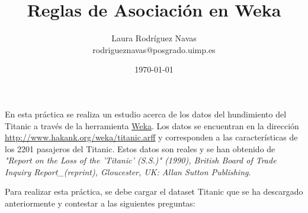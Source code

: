 \documentclass[11pt]{exam}
\title{Reglas de Asociación en Weka}
\author{Laura Rodríguez Navas \\ rodrigueznavas@posgrado.uimp.es}
\date{\today}
\begin{document}
\maketitle

En esta práctica se realiza un estudio acerca de los datos del hundimiento del Titanic a través de la herramienta \href{https://www.cs.waikato.ac.nz/ml/weka/}{Weka}. Los datos se encuentran en la dirección \url{http://www.hakank.org/weka/titanic.arff} y corresponden a las características de los 2201 pasajeros del Titanic. Estos datos son reales y se han obtenido de \textit{"Report on the Loss of the 'Titanic' (S.S.)" (1990), British Board of Trade Inquiry Report\_(reprint), Gloucester, UK: Allan Sutton Publishing}.

\vspace{3mm}

Para realizar esta práctica, se debe cargar el dataset Titanic que se ha descargado anteriormente y contestar a las siguientes preguntas:
\end{document}
